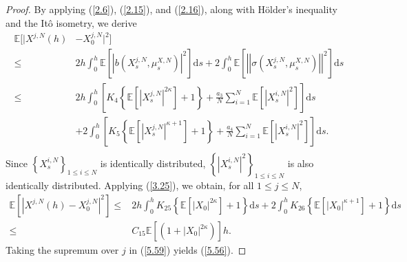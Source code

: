 \documentclass[12pt]{article}
\numberwithin{equation}{section}
\begin{document}
\begin{proof} By applying (\ref{2.6}), (\ref{2.15}), and (\ref{2.16}), along with H\"older's inequality and the It\^o isometry, we derive
\begin{equation}\tag{5.87}\label{5.58}
\begin{aligned}
 \mathbb{E} \bigg[\big|X^{j,N}\left(h\right)&-X^{j,N}_0\big|^{2}\bigg] \\
 \leq& 2 h \int_0^h \mathbb{E}\left[\left|b\left(X_s^{j, N}, \mu_s^{X, N}\right)\right|^{2}\right] \mathrm{d} s+2  \int_0^h \mathbb{E}\left[\left|\left|\sigma\left(X_s^{j, N}, \mu_s^{X, N}\right)\right|\right|^{2}\right] \mathrm{d} s \\
 \leq& 2 h \int_0^h\left[K_4\left\{ \mathbb{E}\left[\left|X_s^{j, N}\right|^{2\kappa}\right]+1 \right\} +\tfrac{a_3}{N}\sum_{i=1}^N{\mathbb{E}\left[\left|{X}^{i,N}_s\right|^2\right]}\right] \mathrm{d} s\\
&+2  \int_0^h \left[K_5\left\{ \mathbb{E}\left[\left|X_s^{j, N}\right|^{\kappa+1}\right]+1\right\} +\tfrac{a_4}{N}\sum_{i=1}^N{\mathbb{E}\left[\left|{X}^{i,N}_s\right|^2\right]}\right] \mathrm{d} s.\\
  \end{aligned}
\end{equation}
Since $\left\{ {X}^{i,N}_s \right\} _{1\leqslant i\leqslant N}$ is identically distributed, $\left\{ \left|{X}^{i,N}_s\right|^2 \right\} _{1\leqslant i\leqslant N}$ is also identically distributed.
Applying (\ref{3.25}), we obtain, for all $1\leq j\leq N$,   
\begin{equation}\tag{5.88}\label{5.59}
\begin{aligned}
 \mathbb{E}\left[\left|X^{j,N}\left(h\right)-X^{j,N}_0\right|^{2}\right]  
 \leq& 2 h \int_0^hK_{25}\left\{ \mathbb{E}\left[\left|X_{0}\right|^{2\kappa}\right]+1 \right\} \mathrm{d} s+2  \int_0^h K_{26}\left\{ \mathbb{E}\left[\left|X_{0}\right|^{\kappa+1}\right]+1\right\} \mathrm{d} s \\
\leq&  C_{15} \mathbb{E}\left[\left(1+\left|X_0\right|^{2 \kappa }\right)\right] h.
\end{aligned}
\end{equation}
Taking the supremum over $ j $ in (\ref{5.59}) yields (\ref{5.56}).


\end{proof}
\end{document}
